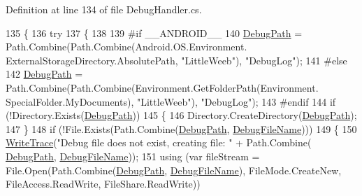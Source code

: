 Definition at line 134 of file Debug\+Handler.\+cs.


\begin{DoxyCode}
135         \{
136             \textcolor{keywordflow}{try}
137             \{
138 
139 \textcolor{preprocessor}{#if \_\_ANDROID\_\_}
140                 \mbox{\hyperlink{class_little_weeb_library_1_1_handlers_1_1_debug_handler_ac3da0e592d7c056dfeb8e60a5a5c1986}{DebugPath}} = Path.Combine(Path.Combine(Android.OS.Environment.
      ExternalStorageDirectory.AbsolutePath, \textcolor{stringliteral}{"LittleWeeb"}), \textcolor{stringliteral}{"DebugLog"});
141 \textcolor{preprocessor}{#else}
142                 \mbox{\hyperlink{class_little_weeb_library_1_1_handlers_1_1_debug_handler_ac3da0e592d7c056dfeb8e60a5a5c1986}{DebugPath}} = Path.Combine(Path.Combine(Environment.GetFolderPath(Environment.
      SpecialFolder.MyDocuments), \textcolor{stringliteral}{"LittleWeeb"}), \textcolor{stringliteral}{"DebugLog"});
143 \textcolor{preprocessor}{#endif}
144                 \textcolor{keywordflow}{if} (!Directory.Exists(\mbox{\hyperlink{class_little_weeb_library_1_1_handlers_1_1_debug_handler_ac3da0e592d7c056dfeb8e60a5a5c1986}{DebugPath}}))
145                 \{
146                     Directory.CreateDirectory(\mbox{\hyperlink{class_little_weeb_library_1_1_handlers_1_1_debug_handler_ac3da0e592d7c056dfeb8e60a5a5c1986}{DebugPath}});
147                 \}
148                 \textcolor{keywordflow}{if} (!File.Exists(Path.Combine(\mbox{\hyperlink{class_little_weeb_library_1_1_handlers_1_1_debug_handler_ac3da0e592d7c056dfeb8e60a5a5c1986}{DebugPath}}, \mbox{\hyperlink{class_little_weeb_library_1_1_handlers_1_1_debug_handler_ac6690e0052ce2a2a040a5160c60fa6d4}{DebugFileName}})))
149                 \{
150                     \mbox{\hyperlink{class_little_weeb_library_1_1_handlers_1_1_debug_handler_ade74885424ad635ba119c8c146bd7e73}{WriteTrace}}(\textcolor{stringliteral}{"Debug file does not exist, creating file: "} + Path.Combine(
      \mbox{\hyperlink{class_little_weeb_library_1_1_handlers_1_1_debug_handler_ac3da0e592d7c056dfeb8e60a5a5c1986}{DebugPath}}, \mbox{\hyperlink{class_little_weeb_library_1_1_handlers_1_1_debug_handler_ac6690e0052ce2a2a040a5160c60fa6d4}{DebugFileName}}));
151                     \textcolor{keyword}{using} (var fileStream = File.Open(Path.Combine(\mbox{\hyperlink{class_little_weeb_library_1_1_handlers_1_1_debug_handler_ac3da0e592d7c056dfeb8e60a5a5c1986}{DebugPath}}, 
      \mbox{\hyperlink{class_little_weeb_library_1_1_handlers_1_1_debug_handler_ac6690e0052ce2a2a040a5160c60fa6d4}{DebugFileName}}), FileMode.CreateNew, FileAccess.ReadWrite, FileShare.ReadWrite))

\end{DoxyCode}
